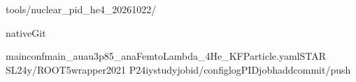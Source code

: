 \documentclass[10pt,a4paper]{article}
\begin{document}
\hspace{0pt}{\jpfont 再現ツール：}\hspace{0pt}tools/\allowbreak{}nuclear\_\allowbreak{}pid\_\allowbreak{}he4\_\allowbreak{}20261022/\allowbreak{}\hspace{0pt}{\jpfont 。}\hspace{0pt}

\hspace{0pt}{\jpfont 設定・係数・選択条件・集約値・各}\hspace{0pt}native\hspace{0pt}{\jpfont 区間の値、ソースとコマンドを同梱。}\hspace{0pt}Git\hspace{0pt}{\jpfont 元ヘッダと候補差分も保存。}\hspace{0pt}

mainconf\hspace{0pt}{\jpfont ：}\hspace{0pt}main\_\allowbreak{}auau3p85\_\allowbreak{}anaFemtoLambda\_\allowbreak{}4He\_\allowbreak{}KFParticle.yaml\hspace{0pt}{\jpfont 。}\hspace{0pt}STAR SL24y/\allowbreak{}ROOT5\hspace{0pt}{\jpfont の既存}\hspace{0pt}wrapper\hspace{0pt}{\jpfont で実行。}\hspace{0pt}2021 P24iy\hspace{0pt}{\jpfont キャッシュのローカル}\hspace{0pt}study\hspace{0pt}{\jpfont で新規}\hspace{0pt}jobid/\allowbreak{}configlog\hspace{0pt}{\jpfont なし。本番}\hspace{0pt}PID\hspace{0pt}{\jpfont 反映・}\hspace{0pt}job\hspace{0pt}{\jpfont 投入・}\hspace{0pt}hadd\hspace{0pt}{\jpfont ・}\hspace{0pt}commit/\allowbreak{}push\hspace{0pt}{\jpfont なし。}\hspace{0pt}
\end{document}
